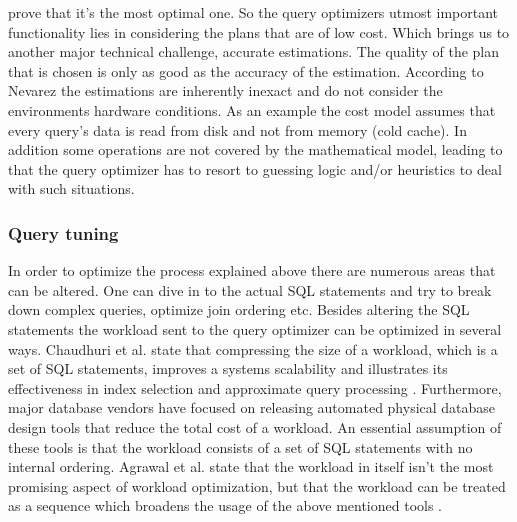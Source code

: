 \documentclass{cslthse-msc}
\begin{document}
\noindent prove that it's the most optimal one. So the query optimizers utmost important functionality lies in considering the plans that are of low cost. Which brings us to another major technical challenge, accurate estimations. The quality of the plan that is chosen is only as good as the accuracy of the estimation. According to Nevarez    \cite{Nevarez} the estimations are inherently inexact and do not consider the environments hardware conditions. As an example the cost model assumes that every query's data is read from disk and not from memory (cold cache). In addition some operations are not covered by the mathematical model, leading to that the query optimizer has to resort to guessing logic and/or heuristics to deal with such situations. 

\subsubsection{Query tuning}
In order to optimize the process explained above there are numerous areas that can be altered. One can dive in to the actual SQL statements and try to break down complex queries, optimize join ordering etc. Besides altering the SQL statements the workload sent to the query optimizer can be optimized in several ways. Chaudhuri et al. state that compressing the size of a workload, which is a set of SQL statements, improves a systems scalability and illustrates its effectiveness in index selection and approximate query processing   \cite{compressing}. Furthermore, major database vendors have focused on releasing automated physical database design tools that reduce the total cost of a workload. An essential assumption of these tools is that the workload consists of a set of SQL statements with no internal ordering. Agrawal et al. state that the workload in itself isn't the most promising aspect of workload optimization, but that the workload can be treated as a sequence which broadens the usage of the above mentioned tools   \cite{automatic}.
\end{document}
